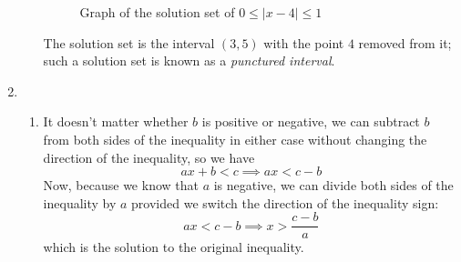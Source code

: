 \documentclass{article}
\begin{document}
\begin{enumerate}
\begin{enumerate}
\begin{figure}[htbp]
      \centering
      \caption{Graph of the solution set of $0\le |x-4| \le 1$}
      \label{fig:0LTabsx-4LT1}
    \end{figure}
    The solution set is the interval $(3,5)$ with the point $4$
    removed from it; such a solution set is known as a
    \textit{punctured interval}.
  \end{enumerate}
\item %
  \begin{enumerate}
  \item %
    It doesn't matter whether $b$ is positive or negative, we can
    subtract $b$ from both sides of the inequality in either case
    without changing the direction of the inequality, so we have  
    \begin{equation*}
      ax+b < c \implies ax < c-b
    \end{equation*}
    Now, because we know that $a$ is negative, we can divide both
    sides of the inequality by $a$ provided we switch the direction of
    the inequality sign:
    \begin{equation*}
      ax < c-b \implies x > \frac{c-b}{a}
    \end{equation*}
    which is the solution to the original inequality.

\end{enumerate}
\end{enumerate}
\end{document}
